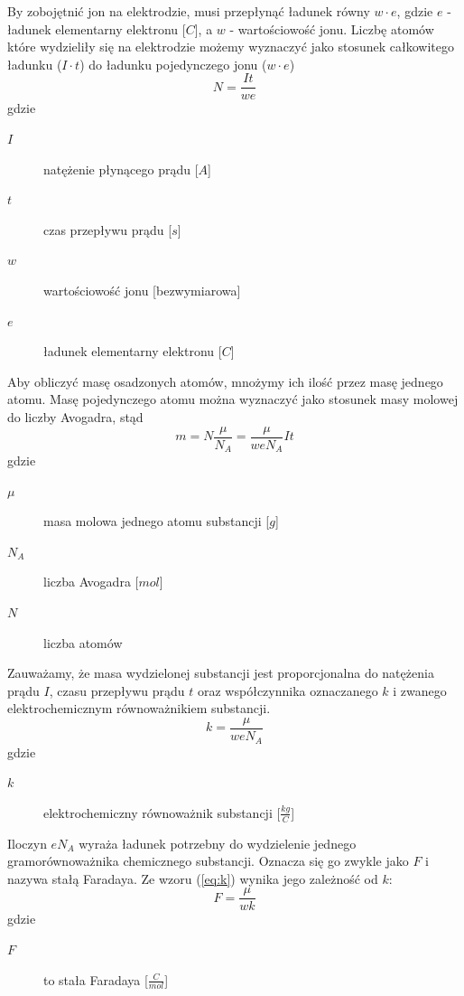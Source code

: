 \documentclass[a4paper,11pt]{article}
\begin{document}
\indent By zobojętnić jon na elektrodzie, musi przepłynąć ładunek równy $w \cdot e$, gdzie $e$ - ładunek elementarny elektronu [$C$], a $w$ - wartościowość jonu.
Liczbę atomów które wydzieliły się na elektrodzie możemy wyznaczyć jako stosunek całkowitego ładunku ($I\cdot t$) do ładunku pojedynczego jonu ($w \cdot e$)
\begin{equation}
N=\frac{It}{we}
\end{equation}
gdzie
\begin{description}
\item [$I$] natężenie płynącego prądu [$A$]
\item [$t$] czas przepływu prądu [$s$]
\item [$w$] wartościowość jonu [bezwymiarowa]
\item [$e$] ładunek elementarny elektronu [$C$]
\end{description}

\indent Aby obliczyć masę osadzonych atomów, mnożymy ich ilość przez masę jednego atomu. Masę pojedynczego atomu można wyznaczyć jako stosunek masy molowej do
liczby Avogadra, stąd
\begin{equation}
\label{eq:masa}
m=N\frac{\mu}{N_A}=\frac{\mu}{weN_A}It
\end{equation}
gdzie
\begin{description}
\item [$\mu$] masa molowa jednego atomu substancji [$g$]
\item [$N_{A}$] liczba Avogadra [$mol$]
\item [$N$] liczba atomów
\end{description}

\indent Zauważamy, że masa wydzielonej substancji jest proporcjonalna do natężenia prądu $I$, czasu przepływu prądu $t$ oraz współczynnika oznaczanego $k$ i zwanego elektrochemicznym równoważnikiem substancji.
\begin{equation}
\label{eq:k}
k=\frac{\mu}{weN_A}
\end{equation}
gdzie 
\begin{description}
\item [$k$] elektrochemiczny równoważnik substancji [$\frac{kg}{C}$]
\end{description}

\indent Iloczyn $eN_A$ wyraża ładunek potrzebny do wydzielenie jednego gramorównoważnika chemicznego substancji. Oznacza się go zwykle jako $F$ i nazywa stałą Faradaya.
Ze wzoru (\ref{eq:k}) wynika jego zależność od $k$:
\begin{equation}
\label{eq:F}
F=\frac{\mu}{wk}
\end{equation}
gdzie 
\begin{description}
\item [$F$] to stała Faradaya [$\frac{C}{mol}$]
\end{description}
\end{document}
